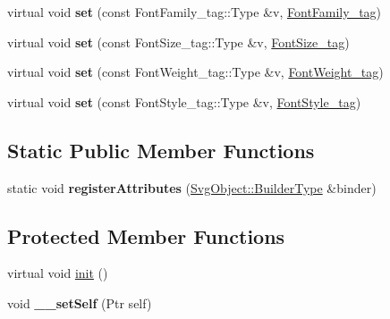 \begin{DoxyCompactItemize}
\item 
\hypertarget{classsambag_1_1disco_1_1svg_1_1_svg_object_a4ade0c6fc8151050569e7ef0a84dacc1}{
virtual void {\bfseries set} (const FontFamily\_\-tag::Type \&v, \hyperlink{structsambag_1_1disco_1_1svg_1_1_svg_object_1_1_font_family__tag}{FontFamily\_\-tag})}
\label{classsambag_1_1disco_1_1svg_1_1_svg_object_a4ade0c6fc8151050569e7ef0a84dacc1}

\item 
\hypertarget{classsambag_1_1disco_1_1svg_1_1_svg_object_a380188d3bebe67790de27fd583c3be91}{
virtual void {\bfseries set} (const FontSize\_\-tag::Type \&v, \hyperlink{structsambag_1_1disco_1_1svg_1_1_svg_object_1_1_font_size__tag}{FontSize\_\-tag})}
\label{classsambag_1_1disco_1_1svg_1_1_svg_object_a380188d3bebe67790de27fd583c3be91}

\item 
\hypertarget{classsambag_1_1disco_1_1svg_1_1_svg_object_ab35d4343859173a7dfb11255bca45eea}{
virtual void {\bfseries set} (const FontWeight\_\-tag::Type \&v, \hyperlink{structsambag_1_1disco_1_1svg_1_1_svg_object_1_1_font_weight__tag}{FontWeight\_\-tag})}
\label{classsambag_1_1disco_1_1svg_1_1_svg_object_ab35d4343859173a7dfb11255bca45eea}

\item 
\hypertarget{classsambag_1_1disco_1_1svg_1_1_svg_object_aa6504bca246a76135310968e39ca8de8}{
virtual void {\bfseries set} (const FontStyle\_\-tag::Type \&v, \hyperlink{structsambag_1_1disco_1_1svg_1_1_svg_object_1_1_font_style__tag}{FontStyle\_\-tag})}
\label{classsambag_1_1disco_1_1svg_1_1_svg_object_aa6504bca246a76135310968e39ca8de8}

\end{DoxyCompactItemize}
\subsection*{Static Public Member Functions}
\begin{DoxyCompactItemize}
\item 
\hypertarget{classsambag_1_1disco_1_1svg_1_1_svg_object_a3491876592666a552c937661cc21aca0}{
static void {\bfseries registerAttributes} (\hyperlink{classsambag_1_1xml_1_1_x_m_l2_object}{SvgObject::BuilderType} \&binder)}
\label{classsambag_1_1disco_1_1svg_1_1_svg_object_a3491876592666a552c937661cc21aca0}

\end{DoxyCompactItemize}
\subsection*{Protected Member Functions}
\begin{DoxyCompactItemize}
\item 
virtual void \hyperlink{classsambag_1_1disco_1_1svg_1_1_svg_object_abe89580d9d709841f9bc09fd77990b5e}{init} ()
\item 
\hypertarget{classsambag_1_1disco_1_1svg_1_1_svg_object_ab96837246a618d2afa370ee8cadf18c4}{
void {\bfseries \_\-\_\-setSelf} (Ptr self)}
\label{classsambag_1_1disco_1_1svg_1_1_svg_object_ab96837246a618d2afa370ee8cadf18c4}

\end{DoxyCompactItemize}
